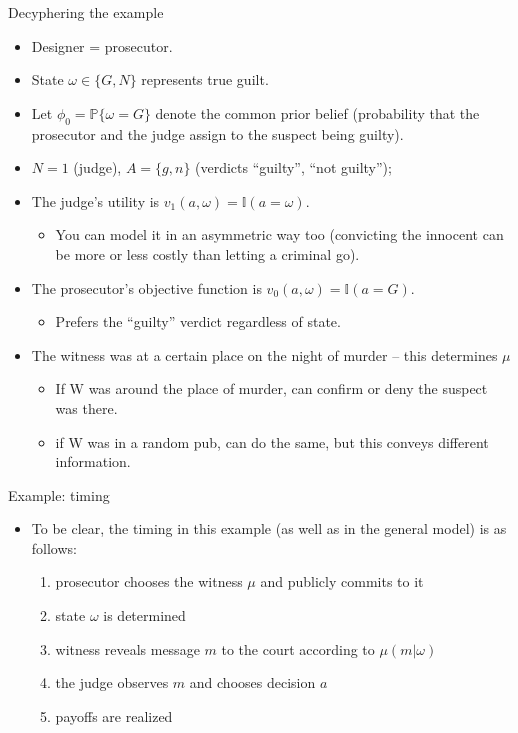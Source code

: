 \documentclass[english,10pt
,aspectratio=169
]{beamer}
\begin{document}
\begin{frame}{Decyphering the example}
\begin{itemize}
	\item Designer = prosecutor.
	\item State $\omega \in \{G,N\}$ represents true guilt. 
	\item Let $\phi_0 = \mathbb{P} \{ \omega = G \}$ denote the common prior belief (probability that the prosecutor and the judge assign to the suspect being guilty).
	\item $N=1$ (judge), $A = \{g,n\}$ (verdicts ``guilty'', ``not guilty'');
	\pause
	\item The judge's utility is $v_1(a,\omega) = \mathbb{I} (a=\omega)$.
	\begin{itemize}
		\item You can model it in an asymmetric way too (convicting the innocent can be more or less costly than letting a criminal go).
	\end{itemize}
	\item The prosecutor's objective function is $v_0(a,\omega) = \mathbb{I} (a=G)$.
	\begin{itemize}
		\item Prefers the ``guilty'' verdict regardless of state.
	\end{itemize}
	\pause
	\item The witness was at a certain place on the night of murder -- this determines $\mu$
	\begin{itemize}
		\item If W was around the place of murder, can confirm or deny the suspect was there.
		\item if W was in a random pub, can do the same, but this conveys different information.
	\end{itemize}
\end{itemize}
\end{frame}


\begin{frame}{Example: timing}
	\begin{itemize}
		\item To be clear, the timing in this example (as well as in the general model) is as follows:
		\begin{enumerate}
			\item prosecutor chooses the witness $\mu$ and publicly commits to it
			\item state $\omega$ is determined
			\item witness reveals message $m$ to the court according to $\mu(m|\omega)$
			\item the judge observes $m$ and chooses decision $a$
			\item payoffs are realized
		\end{enumerate}
	\end{itemize}
\end{frame}
\end{document}
